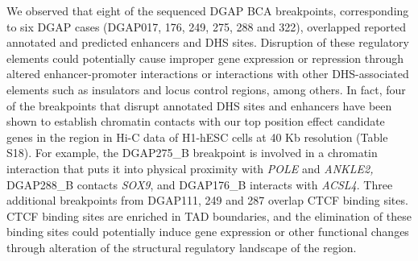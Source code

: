 \documentclass[a4paper,twoside=true,openright,parskip=full,chapterprefix=true,11pt,headings=normal,bibliography=totoc,listof=totoc,titlepage=on,captions=tableabove,draft=false]{scrreprt}
\theoremstyle{definition}
\theoremstyle{definition}
\theoremstyle{definition}
\theoremstyle{remark}
\begin{document}
We observed that eight of the sequenced DGAP BCA breakpoints,
corresponding to six DGAP cases (DGAP017, 176, 249, 275, 288 and 322),
overlapped reported annotated and predicted enhancers and DHS sites.
Disruption of these regulatory elements could potentially cause improper
gene expression or repression through altered enhancer-promoter
interactions or interactions with other DHS-associated elements such as
insulators and locus control regions, among others. In fact, four of the
breakpoints that disrupt annotated DHS sites and enhancers have been
shown to establish chromatin contacts with our top position effect
candidate genes in the region in Hi-C data of H1-hESC cells at 40 Kb
resolution (Table S18). For example, the DGAP275\_B breakpoint is
involved in a chromatin interaction that puts it into physical proximity
with \emph{POLE} and \emph{ANKLE2,} DGAP288\_B contacts \emph{SOX9}, and
DGAP176\_B interacts with \emph{ACSL4}. Three additional breakpoints
from DGAP111, 249 and 287 overlap CTCF binding sites. CTCF binding sites
are enriched in TAD boundaries,\citep{Dixon2012} and the elimination of
these binding sites could potentially induce gene expression or other
functional changes through alteration of the structural regulatory
landscape of the region.\citep{Lupianez2015}
\end{document}
